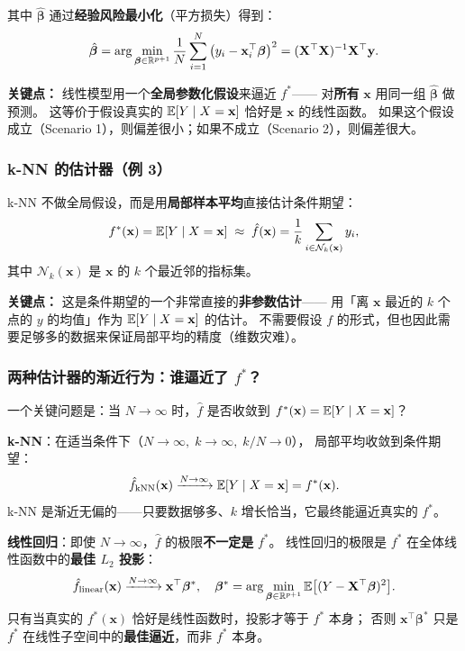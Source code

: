 其中 $\hat{\bm{\beta}}$ 通过\textbf{经验风险最小化}（平方损失）得到：
\begin{equation}\label{eq:linear_erm}
    \hat{\bm{\beta}} = \arg\min_{\bm{\beta} \in \mathbb{R}^{p+1}}
    \frac{1}{N} \sum_{i=1}^{N} \big(y_i - \mathbf{x}_i^\top \bm{\beta}\big)^2
    = (\mathbf{X}^\top \mathbf{X})^{-1} \mathbf{X}^\top \mathbf{y}.
\end{equation}

\textbf{关键点：} 线性模型用一个\textbf{全局参数化假设}来逼近 $f^*$——
对\textbf{所有} $\mathbf{x}$ 用同一组 $\hat{\bm{\beta}}$ 做预测。
这等价于假设真实的 $\mathbb{E}[Y \mid X = \mathbf{x}]$ 恰好是 $\mathbf{x}$ 的线性函数。
如果这个假设成立（Scenario 1），则偏差很小；如果不成立（Scenario 2），则偏差很大。

\subsubsection{k-NN 的估计器（例 3）}

k-NN 不做全局假设，而是用\textbf{局部样本平均}直接估计条件期望：
\begin{equation}\label{eq:knn_approx}
    f^*(\mathbf{x}) = \mathbb{E}[Y \mid X = \mathbf{x}]
    \;\approx\;
    \hat{f}(\mathbf{x}) = \frac{1}{k} \sum_{i \in \mathcal{N}_k(\mathbf{x})} y_i,
\end{equation}
其中 $\mathcal{N}_k(\mathbf{x})$ 是 $\mathbf{x}$ 的 $k$ 个最近邻的指标集。

\textbf{关键点：} 这是条件期望的一个非常直接的\textbf{非参数估计}——
用「离 $\mathbf{x}$ 最近的 $k$ 个点的 $y$ 的均值」作为 $\mathbb{E}[Y \mid X = \mathbf{x}]$ 的估计。
不需要假设 $f$ 的形式，但也因此需要足够多的数据来保证局部平均的精度（维数灾难）。

\subsubsection{两种估计器的渐近行为：谁逼近了 $f^*$？}

一个关键问题是：当 $N \to \infty$ 时，$\hat{f}$ 是否收敛到 $f^*(\mathbf{x}) = \mathbb{E}[Y \mid X = \mathbf{x}]$？

\textbf{k-NN}：在适当条件下（$N \to \infty,\; k \to \infty,\; k/N \to 0$），
局部平均收敛到条件期望：
\[
\hat{f}_{\mathrm{kNN}}(\mathbf{x}) \xrightarrow{N \to \infty} \mathbb{E}[Y \mid X = \mathbf{x}] = f^*(\mathbf{x}).
\]
k-NN 是渐近无偏的——只要数据够多、$k$ 增长恰当，它最终能逼近真实的 $f^*$。

\textbf{线性回归}：即使 $N \to \infty$，$\hat{f}$ 的极限\textbf{不一定是} $f^*$。
线性回归的极限是 $f^*$ 在全体线性函数中的\textbf{最佳 $L_2$ 投影}：
\[
\hat{f}_{\mathrm{linear}}(\mathbf{x}) \xrightarrow{N \to \infty}
\mathbf{x}^\top \bm{\beta}^*,
\quad
\bm{\beta}^* = \arg\min_{\bm{\beta} \in \mathbb{R}^{p+1}}
\mathbb{E}\big[(Y - \mathbf{X}^\top \bm{\beta})^2\big].
\]
只有当真实的 $f^*(\mathbf{x})$ 恰好是线性函数时，投影才等于 $f^*$ 本身；
否则 $\mathbf{x}^\top \bm{\beta}^*$ 只是 $f^*$ 在线性子空间中的\textbf{最佳逼近}，而非 $f^*$ 本身。

